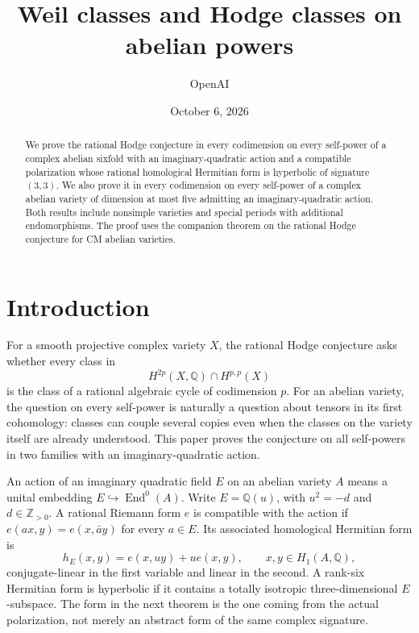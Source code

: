 \documentclass[11pt]{article}
\newcommand{\Q}{\mathbb Q}
\newcommand{\Z}{\mathbb Z}
\numberwithin{equation}{section}
\begin{document}
\title{Weil classes and Hodge classes on abelian powers}
\author{OpenAI}
\date{October 6, 2026}
\maketitle

\begin{abstract}
We prove the rational Hodge conjecture in every codimension on every
self-power of a complex abelian sixfold with an imaginary-quadratic
action and a compatible polarization whose rational homological Hermitian
form is hyperbolic of signature \((3,3)\). We also prove it in every
codimension on every self-power of a complex abelian variety of dimension
at most five admitting an imaginary-quadratic action. Both results include
nonsimple varieties and special periods with additional endomorphisms.
The proof uses the companion theorem on the rational Hodge conjecture for
CM abelian varieties.
\end{abstract}

\begingroup
\small
\tableofcontents
\endgroup
\clearpage

\section{Introduction}
\label{p3:sec:introduction}

For a smooth projective complex variety \(X\), the rational Hodge
conjecture asks whether every class in
\[
 H^{2p}(X,\Q)\cap H^{p,p}(X)
\]
is the class of a rational algebraic cycle of codimension \(p\).
For an abelian variety, the question on every self-power is naturally a
question about tensors in its first cohomology: classes can couple several
copies even when the classes on the variety itself are already understood.
This paper proves the conjecture on all self-powers in two families with an
imaginary-quadratic action.

An action of an imaginary quadratic field \(E\) on an abelian variety
\(A\) means a unital embedding \(E\hookrightarrow\operatorname{End}^0(A)\).
Write \(E=\Q(u)\), with \(u^2=-d\) and \(d\in\Z_{>0}\). A rational Riemann form
\(e\) is compatible with the action if
\(e(ax,y)=e(x,\bar a y)\) for every \(a\in E\). Its associated homological
Hermitian form is
\[
 h_E(x,y)=e(x,uy)+u e(x,y),\qquad x,y\in H_1(A,\Q),
\]
conjugate-linear in the first variable and linear in the second. A rank-six
Hermitian form is hyperbolic if it contains a totally isotropic
three-dimensional \(E\)-subspace. The form in the next theorem is the one
coming from the actual polarization, not merely an abstract form of the
same complex signature.
\end{document}
